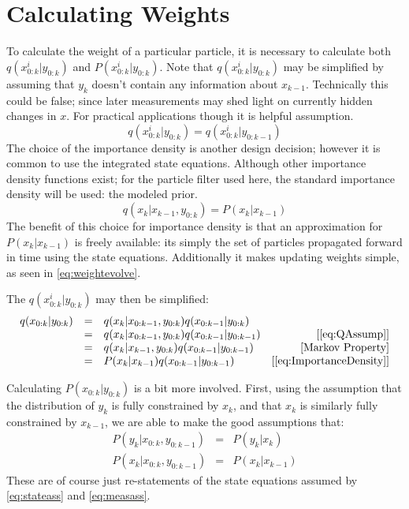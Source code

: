 \section{Calculating Weights}
To calculate the weight of a particular particle, it is necessary to 
calculate both $q(x^i_{0:k} | y_{0:k})$ and $P(x^i_{0:k} | y_{0:k})$.
Note that $q(x^i_{0:k} | y_{0:k})$ may be simplified by assuming that 
$y_k$ doesn't contain any information about $x_{k-1}$. Technically this 
could be false; since later measurements may shed light on currently hidden
changes in $x$. For practical applications though it is helpful assumption.
\begin{equation}
q(x^i_{0:k} | y_{0:k}) = q(x^i_{0:k} | y_{0:k-1})
\label{eq:QAssump}
\end{equation}
The choice of the importance density is another design decision; however
it is common to use the integrated state equations. 
Although other importance density functions exist; for the particle filter
used here, the standard importance density will be used: the modeled
prior.
\begin{equation}
q(x_k | x_{k-1}, y_{0:k}) =  P(x_k | x_{k-1})
\label{eq:ImportanceDensity}
\end{equation}
The benefit of this choice for importance density is that an approximation for
$P(x_k | x_{k-1})$ is freely available: its simply the set of particles propagated
forward in time using the state equations. Additionally it makes
updating weights simple, as seen in \autoref{eq:weightevolve}.

The $q(x^i_{0:k} | y_{0:k})$ may then be simplified:
\begin{equation}
\begin{array}{cclr}
q(x_{0:k} | y_{0:k}) & = & q(x_k | x_{0:k-1}, y_{0:k})q(x_{0:k-1} | y_{0:k}) &  \\
& = & q(x_k | x_{0:k-1}, y_{0:k})q(x_{0:k-1} | y_{0:k-1})  & \text{[\autoref{eq:QAssump}]} \\
& = & q(x_k | x_{k-1}, y_{0:k})q(x_{0:k-1} | y_{0:k-1})  & \text{[Markov Property]}\\
& = & P(x_k | x_{k-1})q(x_{0:k-1} | y_{0:k-1})  & \text{[\autoref{eq:ImportanceDensity}]}
\end{array}
\end{equation}

Calculating $P(x_{0:k} | y_{0:k})$ is a bit more involved. 
First, using the assumption that the distribution of $y_k$ is 
fully constrained by $x_k$, and that $x_k$ is similarly fully 
constrained by $x_{k-1}$, we are able to make the good assumptions that:
\begin{eqnarray}
P(y_k | x_{0:k}, y_{0:k-1}) &=& P(y_k | x_k) \nonumber \\
P(x_k | x_{0:k}, y_{0:k-1}) &=& P(x_k | x_{k-1})
\label{eq:MarkovProperty}
\end{eqnarray}
These are of course just re-statements of the state equations assumed by \autoref{eq:stateass}
and \autoref{eq:measass}.

